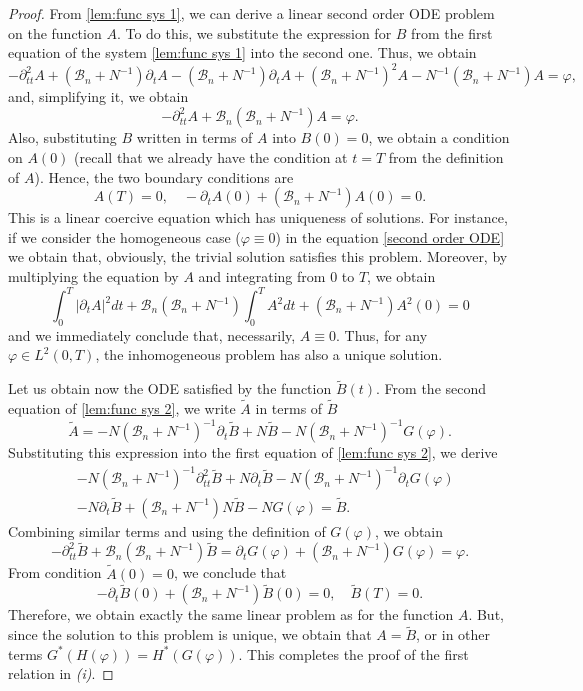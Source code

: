 \documentclass[reqno]{amsart}
\begin{document}
\begin{proof}
From \eqref{lem:func sys 1}, we can derive a linear second order
ODE problem on the function $A$. To do this, we substitute the expression
for $B$ from the first equation of the system \eqref{lem:func sys 1} into
the second one. Thus, we obtain
\[
-\partial _{tt}^2A+(\mathcal{B}_n+N^{-1})\partial _{t}A-(\mathcal{B}%
_n+N^{-1})\partial _{t}A+(\mathcal{B}_n+N^{-1})^2A-N^{-1}(\mathcal{B}%
_n+N^{-1})A=\varphi ,
\]%
and, simplifying it, we obtain
\begin{equation}
-\partial _{tt}^2A+\mathcal{B}_n(\mathcal{B}_n+N^{-1})A=\varphi .
\label{second order ODE}
\end{equation}%
Also, substituting $B$ written in terms of $A$ into $B(0)=0$, we obtain a
condition on $A(0)$ (recall that we already have the condition at $t=T$ from
the definition of $A$). Hence, the two boundary conditions are
\begin{equation}
A(T)=0,\quad -\partial _{t}A(0)+(\mathcal{B}_n+N^{-1})A(0)=0.
\label{bound cond ODE}
\end{equation}
This is a linear coercive equation which has uniqueness of solutions. For
instance, if we consider the homogeneous case ($\varphi \equiv 0$) in the
equation \eqref{second order ODE} we obtain that, obviously, the trivial
solution satisfies this problem. Moreover, by multiplying the equation by $A$
and integrating from $0$ to $T$, we obtain
\[
\int _0^{T}|\partial _{t}A|^2{dt}+\mathcal{B}_n(\mathcal{B}%
_n+N^{-1})\int _0^{T}A^2{dt}+(\mathcal{B}_n+N^{-1})A^2(0)=0
\]
and we immediately conclude that, necessarily, $A\equiv 0$. Thus, for any
$\varphi \in L^2(0,T)$, the inhomogeneous problem has also a unique
solution.

Let us obtain now the ODE satisfied by the function $\tilde{B}(t)$. From the
second equation of \eqref{lem:func sys 2}, we write $\tilde{A}$ in terms of 
$\tilde{B}$
\[
\tilde{A}=-N(\mathcal{B}_n+N^{-1})^{-1}\partial _{t}\tilde{B}+N\tilde{B}-N(%
\mathcal{B}_n+N^{-1})^{-1}G(\varphi ).
\]
Substituting this expression into the first equation of
\eqref{lem:func sys 2}, we derive
\begin{align*}
&-N(\mathcal{B}_n+N^{-1})^{-1}\partial _{tt}^2\tilde{B}+N\partial _{t}%
\tilde{B}-N(\mathcal{B}_n+N^{-1})^{-1}\partial _{t}G(\varphi ) \\
&-N\partial _{t}\tilde{B}+(\mathcal{B}_n+N^{-1})N\tilde{B}-NG(\varphi )=%
\tilde{B}.
\end{align*}
Combining similar terms and using the definition of $G(\varphi )$, we obtain
\[
-\partial _{tt}^2\tilde{B}+\mathcal{B}_n(\mathcal{B}_n+N^{-1})\tilde{B}%
=\partial _{t}G(\varphi )+(\mathcal{B}_n+N^{-1})G(\varphi )=\varphi .
\]
From condition $\tilde{A}(0)=0$, we conclude that
\[
-\partial _{t}\tilde{B}(0)+(\mathcal{B}_n+N^{-1})\tilde{B}(0)=0,\quad
\tilde{B}(T)=0.
\]
Therefore, we obtain exactly the same linear problem as for the function $A$.
But, since the solution to this problem is unique, we obtain that $A=\tilde{B}$,
or in other terms $G^{\ast }(H(\varphi ))=H^{\ast }(G(\varphi ))$. This
completes the proof of the first relation in \textit{(i)}.


\end{proof}
\end{document}
